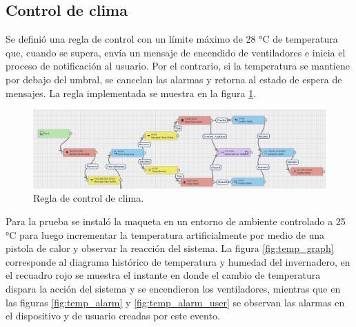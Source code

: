\pagebreak

\subsection{Control de clima}
\label{sec:Control de clima}

Se definió una regla de control con un límite máximo de 28 °C de temperatura que, cuando se supera, envía un mensaje de encendido de ventiladores e inicia el proceso de notificación  al usuario. Por el contrario, si la temperatura se mantiene por debajo del umbral, se cancelan las alarmas y retorna al estado de espera de mensajes. La regla implementada se muestra en la figura \ref{fig:temp_rule}.  

\begin{figure}[h]
	\centering
	\includegraphics[width=1\textwidth]{./Figures/chapter4/temp_rule.jpg}
	\caption[Regla de control de clima]{Regla de control de clima.}
	\label{fig:temp_rule}
\end{figure}

Para la prueba se instaló la maqueta en un entorno de ambiente controlado a 25 °C para luego incrementar la temperatura artificialmente por medio de una pistola de calor y observar la reacción del sistema. La figura \ref{fig:temp_graph} corresponde al diagrama histórico de temperatura y humedad del invernadero, en el recuadro rojo se muestra el instante en donde el cambio de temperatura dispara la acción del sistema y se encendieron los ventiladores, mientras que en las figuras \ref{fig:temp_alarm} y \ref{fig:temp_alarm_user} se observan las alarmas en el dispositivo y de usuario creadas por este evento.  









